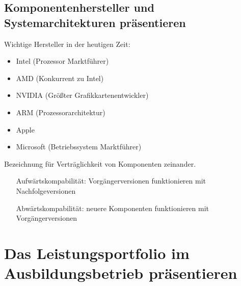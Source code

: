 \documentclass[11pt]{article}
\newlength{\subsectionindent}
\newenvironment{indentedtext}[1][\subsectionindent]
{%
  \begingroup
  \setlength{\leftskip}{#1}%
  \setlength{\parindent}{0pt}%
}
{%
  \par\endgroup
}
\begin{document}
\subsection{Komponentenhersteller und Systemarchitekturen präsentieren}
    \begin{indentedtext}
        Wichtige Hersteller in der heutigen Zeit:
    \end{indentedtext}
    \vspace{-0.5em}
    \begin{itemize}[leftmargin=2.5cm]
        \item Intel (Prozessor Marktführer)
        \item AMD (Konkurrent zu Intel)
        \item NVIDIA (Größter Grafikkartenentwickler)
        \item ARM (Prozessorarchitektur)
        \item Apple
        \item Microsoft (Betriebssystem Marktführer)
    \end{itemize}
    \vspace{0.5em}
    \begin{tcolorbox}[width=15cm, center, title=Kompatibilität, coltitle=white, colframe=white!20!blue, colback=white!80!blue]
        Bezeichnung für Verträglichkeit von Komponenten zeinander.
        \begin{itemize}[labelsep=1em, align=parleft, leftmargin=*, widest=Abwärtskompabilität, itemsep=0em]
            \item[Aufwärtskompabilität:] Vorgängerversionen funktionieren mit Nachfolgeversionen
            \item[Abwärtskompabilität: ] neuere Komponenten funktionieren mit Vorgängerversionen
        \end{itemize}
    \end{tcolorbox}

\newpage
\section{Das Leistungsportfolio im Ausbildungsbetrieb präsentieren}
\end{document}
